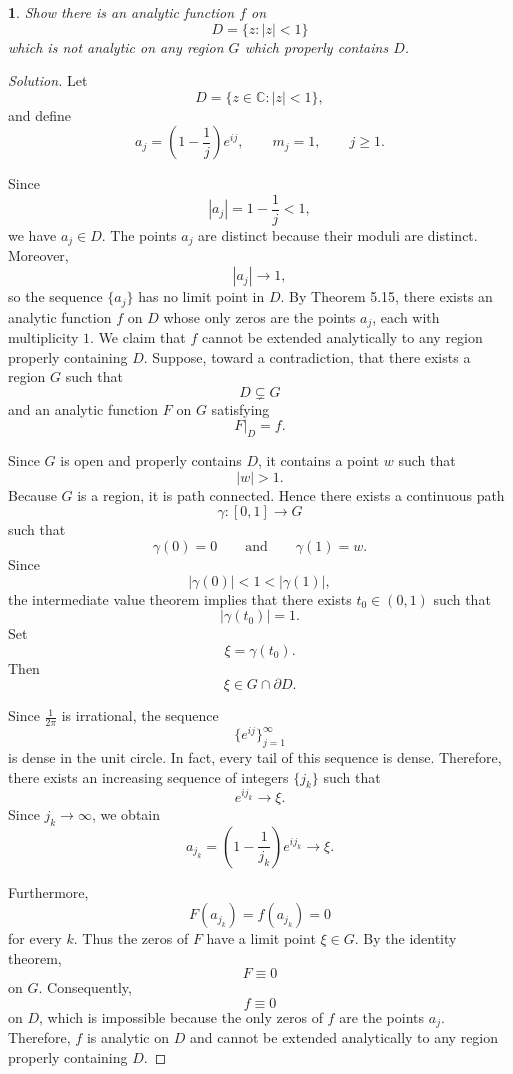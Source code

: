 \documentclass[12pt, a4paper]{report}
\theoremstyle{spaced}
\newtheorem{exercise}{}
\begin{document}
\begin{exercise}
	Show there is an analytic function \(f\) on
	\[
		D=\{z:|z|<1\}
	\]
	which is not analytic on any region \(G\) which properly contains \(D\).
\end{exercise}
\begin{proof}[Solution]
	Let
	\[
		D=\{z\in\mathbb{C}:|z|<1\},
	\]
	and define
	\[
		a_j=\left(1-\frac{1}{j}\right)e^{ij},
		\qquad
		m_j=1,
		\qquad j\geq 1.
	\]

	Since
	\[
		|a_j|=1-\frac{1}{j}<1,
	\]
	we have $a_j\in D$. The points $a_j$ are distinct because their moduli are distinct. Moreover,
	\[
		|a_j|\longrightarrow 1,
	\]
	so the sequence $\{a_j\}$ has no limit point in $D$.
	By Theorem 5.15, there exists an analytic function $f$ on $D$ whose only zeros are the points $a_j$, each with multiplicity $1$.
	We claim that $f$ cannot be extended analytically to any region properly containing $D$. Suppose, toward a contradiction, that there exists a region $G$ such that
	\[
		D\subsetneq G
	\]
	and an analytic function $F$ on $G$ satisfying
	\[
		F|_D=f.
	\]

	Since $G$ is open and properly contains $D$, it contains a point $w$ such that
	\[
		|w|>1.
	\]
	Because $G$ is a region, it is path connected. Hence there exists a continuous path
	\[
		\gamma:[0,1]\longrightarrow G
	\]
	such that
	\[
		\gamma(0)=0
		\qquad\text{and}\qquad
		\gamma(1)=w.
	\]
	Since
	\[
		|\gamma(0)|<1<|\gamma(1)|,
	\]
	the intermediate value theorem implies that there exists $t_0\in(0,1)$ such that
	\[
		|\gamma(t_0)|=1.
	\]
	Set
	\[
		\xi=\gamma(t_0).
	\]
	Then
	\[
		\xi\in G\cap\partial D.
	\]

	Since $\frac{1}{2\pi}$ is irrational, the sequence
	\[
		\{e^{ij}\}_{j=1}^{\infty}
	\]
	is dense in the unit circle. In fact, every tail of this sequence is dense. Therefore, there exists an increasing sequence of integers $\{j_k\}$ such that
	\[
		e^{ij_k}\longrightarrow \xi.
	\]
	Since $j_k\to\infty$, we obtain
	\[
		a_{j_k}
		=
		\left(1-\frac{1}{j_k}\right)e^{ij_k}
		\longrightarrow \xi.
	\]

	Furthermore,
	\[
		F(a_{j_k})=f(a_{j_k})=0
	\]
	for every $k$. Thus the zeros of $F$ have a limit point $\xi\in G$. By the identity theorem,
	\[
		F\equiv 0
	\]
	on $G$. Consequently,
	\[
		f\equiv 0
	\]
	on $D$, which is impossible because the only zeros of $f$ are the points $a_j$.
	Therefore, $f$ is analytic on $D$ and cannot be extended analytically to any region properly containing $D$.
\end{proof}
\end{document}
